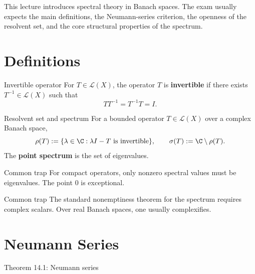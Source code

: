 \documentclass[header={Lecture 10 Exam Study Notes}]{study-note}
\begin{document}

\vspace{0.8em}

\begin{focusbox}
This lecture introduces spectral theory in Banach spaces. The exam usually expects the main definitions, the Neumann-series criterion, the openness of the resolvent set, and the core structural properties of the spectrum.
\end{focusbox}

\tableofcontents

\section{Definitions}

\begin{defbox}{Invertible operator}
For $T\in\mathcal L(X)$, the operator $T$ is \textbf{invertible} if there exists $T^{-1}\in\mathcal L(X)$ such that
\[
TT^{-1}=T^{-1}T=I.
\]
\end{defbox}

\begin{defbox}{Resolvent set and spectrum}
For a bounded operator $T\in\mathcal L(X)$ over a complex Banach space,
\[
\rho(T):=\{\lambda\in\C : \lambda I-T \text{ is invertible}\},
\qquad
\sigma(T):=\C\setminus \rho(T).
\]
The \textbf{point spectrum} is the set of eigenvalues.
\end{defbox}

\begin{warningbox}{Common trap}
For compact operators, only nonzero spectral values must be eigenvalues. The point $0$ is exceptional.
\end{warningbox}

\begin{warningbox}{Common trap}
The standard nonemptiness theorem for the spectrum requires complex scalars. Over real Banach spaces, one usually complexifies.
\end{warningbox}

\section{Neumann Series}

\begin{thmbox}{Theorem 14.1: Neumann series}
\thmNeumannSeries
\end{thmbox}
\end{document}
